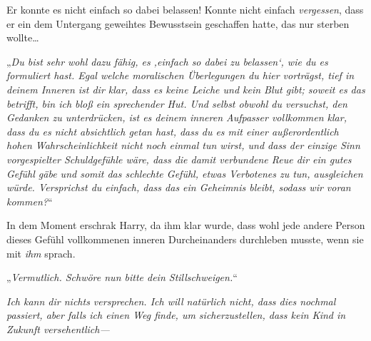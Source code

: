 Er konnte es nicht einfach so dabei belassen! Konnte nicht einfach \emph{vergessen}, dass er ein dem Untergang geweihtes Bewusstsein geschaffen hatte, das nur sterben wollte…

„\emph{Du bist sehr wohl dazu fähig, es ‚einfach so dabei zu belassen‘, wie du es formuliert hast. Egal welche moralischen Überlegungen du hier vorträgst, tief in deinem Inneren ist dir klar, dass es keine Leiche und kein Blut gibt; soweit es das betrifft, bin ich bloß ein sprechender Hut. Und selbst obwohl du versuchst, den Gedanken zu unterdrücken, ist es deinem inneren Aufpasser vollkommen klar, dass du es nicht absichtlich getan hast, dass du es mit einer außerordentlich hohen Wahrscheinlichkeit nicht noch einmal tun wirst, und dass der einzige Sinn vorgespielter Schuldgefühle wäre, dass die damit verbundene Reue dir ein gutes Gefühl gäbe und somit das schlechte Gefühl, etwas Verbotenes zu tun, ausgleichen würde. Versprichst du einfach, dass das ein Geheimnis bleibt, sodass wir voran kommen?}“

In dem Moment erschrak Harry, da ihm klar wurde, dass wohl jede andere Person dieses Gefühl vollkommenen inneren Durcheinanders durchleben musste, wenn sie mit \emph{ihm} sprach.

„\emph{Vermutlich. Schwöre nun bitte dein Stillschweigen.}“

\emph{Ich kann dir nichts versprechen. Ich will natürlich nicht, dass dies nochmal passiert, aber falls ich einen Weg finde, um sicherzustellen, dass kein Kind in Zukunft versehentlich—}

